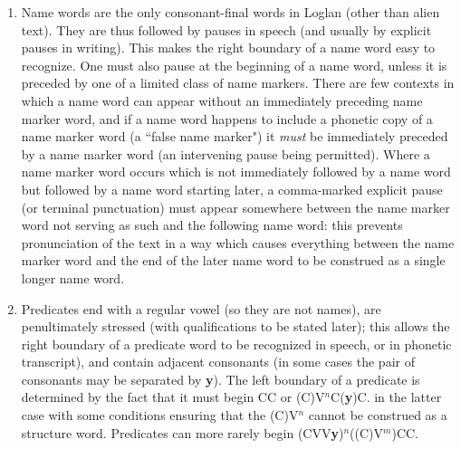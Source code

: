 \documentclass[12pt]{book}
\begin{document}
\begin{enumerate}

\item Name words are the only consonant-final words in Loglan (other than alien text).  They are thus followed by pauses in speech (and usually by explicit pauses in writing).  This makes the right boundary of a name word easy to recognize.  One must also pause at the beginning of a name word, unless it is preceded by one of a limited class of name markers.  There are few contexts in which a name word can appear without an immediately  preceding name marker word, and if a name word happens to include a phonetic copy of a name marker word (a ``false name marker") it {\em must\/} be immediately preceded by a name marker word (an intervening pause being permitted).  Where a name marker word occurs which is not immediately followed by a name word but followed by a name word starting later, a comma-marked explicit pause (or terminal punctuation) must appear somewhere between the name marker word not serving as such and the following name word:  this prevents pronunciation of the text in a way which causes everything between the name marker word and the end of the later name word to be construed as a single longer name word.

\item Predicates end with a regular vowel (so they are not names), are penultimately stressed (with qualifications to be stated later);  this allows the right boundary of a predicate word to be recognized in speech, or in phonetic transcript), and contain adjacent consonants (in some cases the pair of consonants may be separated by {\bf y}).  The left boundary of a predicate is determined
by the fact that it must begin CC or (C)V$^n$C({\bf y})C.  in the latter case with some conditions ensuring that the (C)V$^n$ cannot be construed as a structure word.  Predicates
can more rarely begin (CVV{\bf y})$^n$((C)V$^m$)CC.


\end{enumerate}
\end{document}
